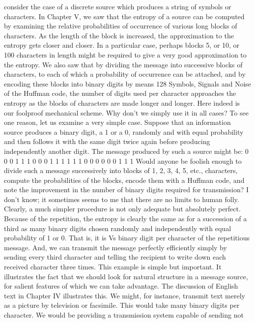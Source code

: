 {{{consider the case of a discrete source which produces a string of
symbols or characters.
In Chapter V, we saw that the entropy of a source can be computed
by examining the relative probabilities of occurrence of
various long blocks of characters. As the length of the block is
increased, the approximation to the entropy gets closer and closer.
In a particular case, perhaps blocks 5, or 10, or 100 characters in
length might be required to give a very good approximation to
the entropy.
We also saw that by dividing the message into successive blocks
of characters, to each of which a probability of occurrence can be
attached, and by encoding these blocks into binary digits by means
128 Symbols, Signals and Noise
of the Huffman code, the number of digits used per character
approaches the entropy as the blocks of characters are made longer
and longer.
Here indeed is our foolproof mechanical scheme. Why don’t we
simply use it in all cases?
To see one reason, let us examine a very simple case. Suppose
that an information source produces a binary digit, a 1 or a 0,
randomly and with equal probability and then follows it with the
same digit twice again before producing independently another
digit. The message produced by such a source might be:
0 0 0 1 1 1 0 0 0 1 1 1 1 1 1 0 0 0 0 0 0 1 1 1
Would anyone be foolish enough to divide such a message
successively into blocks of 1, 2, 3, 4, 5, etc., characters, compute
the probabilities of the blocks, encode them with a Huffman code,
and note the improvement in the number of binary digits required
for transmission? I don’t know; it sometimes seems to me that there
are no limits to human folly.
Clearly, a much simpler procedure is not only adequate but
absolutely perfect. Because of the repetition, the entropy is clearly
the same as for a succession of a third as many binary digits chosen
randomly and independently with equal probability of 1 or 0. That
is, it is Vs binary digit per character of the repetitious message. And,
we can transmit the message perfectly efficiently simply by sending
every third character and telling the recipient to write down each
received character three times.
This example is simple but important. It illustrates the fact that
we should look for natural structure in a message source, for salient
features of which we can take advantage.
The discussion of English text in Chapter IV illustrates this. We
might, for instance, transmit text merely as a picture by television
or facsimile. This would take many binary digits per character. We
would be providing a transmission system capable of sending not
}}}
